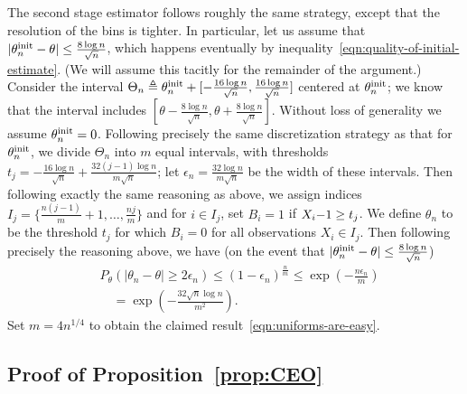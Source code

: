 The second stage estimator follows roughly the same strategy, except that
the resolution of the bins is tighter. In particular, let us assume that
$|\theta_n^{\textup{init}} - \theta| \le \frac{8 \log n}{\sqrt{n}}$, which happens
eventually by inequality~\eqref{eqn:quality-of-initial-estimate}.  (We will
assume this tacitly for the remainder of the argument.)  Consider the
interval $\Theta_n \triangleq \theta_n^{\textup{init}} + [-\frac{16 \log n}{\sqrt{n}},
  \frac{16 \log n}{\sqrt{n}}]$ centered at $\theta_n^{\textup{init}}$; we know that the
interval includes $[\theta - \frac{8 \log n}{\sqrt{n}}, \theta + \frac{8
    \log n}{\sqrt{n}}]$. Without loss of generality we assume $\theta_n^{\textup{init}}
= 0$.  Following precisely the same discretization strategy as that for
$\theta_n^{\textup{init}}$, we divide $\Theta_n$ into $m$ equal intervals, with
thresholds $t_j = -\frac{16 \log n}{\sqrt{n}} + \frac{32 (j - 1) \log n}{m
  \sqrt{n}}$; let $\epsilon_n = \frac{32 \log n}{m \sqrt{n}}$ be the width of
these intervals.  Then following exactly the same reasoning as above, we
assign indices $I_j = \{\frac{n(j - 1)}{m} + 1, \ldots, \frac{n j}{m}\}$ and
for $i \in I_j$, set $B_i = 1$ if $X_i {\color{black} {- 1}} \ge t_j$. We define $\theta_n$ to be
the  threshold $t_j$ for which $B_i = 0$ for all observations $X_i
\in I_j$. Then following precisely the reasoning above, we have (on the
event that $|\theta_n^{\textup{init}} - \theta| \le \frac{8 \log n}{\sqrt{n}}$)
\begin{align*}
  & P_\theta(|\theta_n - \theta|
  \ge 2 \epsilon_n)
  \le (1 - \epsilon_n)^\frac{n}{m}
  \le \exp\left(-\frac{n \epsilon_n}{m}\right) \\
  & \quad = \exp\left(-\frac{32 \sqrt{n} \log n}{m^2}\right).
\end{align*}
Set $m = 4 n^{1/4}$ to obtain the claimed
result~\eqref{eqn:uniforms-are-easy}.



\subsection{Proof of Proposition~\ref{prop:CEO}
\label{app:proof:CEO}}

